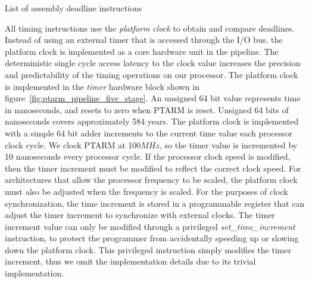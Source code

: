 \begin{table}[b]
\noindent{}
\vspace{1mm}
\caption{List of assembly deadline instructions}
\label{table_deadline_insts}
\end{table}

All timing instructions use the \emph{platform clock} to obtain and compare deadlines.
Instead of using an external timer that is accessed through the I/O bus, the platform clock is implemented as a core hardware unit in the pipeline.  
The deterministic single cycle access latency to the clock value increases the precision and predictability of the timing operations on our processor.  
The platform clock is implemented in the \emph{timer} hardware block shown in figure~\ref{fig:ptarm_pipeline_five_stage}.   
An unsigned 64 bit value represents time in nanoseconds, and resets to zero when PTARM is reset.
Unsigned 64 bits of nanoseconds covers approximately 584 years. 
The platform clock is implemented with a simple 64 bit adder increments to the current time value each processor clock cycle. 
We clock PTARM at 100$MHz$, so the timer value is incremented by 10 nanoseconds every processor cycle.
If the processor clock speed is modified, then the timer increment must be modified to reflect the correct clock speed. 
For architectures that allow the processor frequency to be scaled, the platform clock must also be adjusted when the frequency is scaled.  
For the purposes of clock synchronization, the time increment is stored in a programmable register that can adjust the timer increment to synchronize with external clocks. 
The timer increment value can only be modified through a privileged \emph{set\_time\_increment} instruction, to protect the programmer from accidentally speeding up or slowing down the platform clock.
This privileged instruction simply modifies the timer increment, thus we omit the implementation details due to its trivial implementation.

